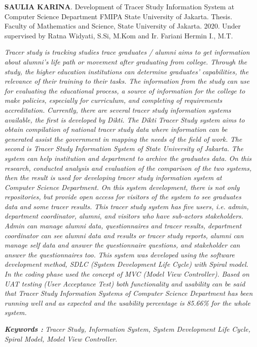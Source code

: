 \documentclass{jtetiskripsi}
\begin{document}
\begin{abstracteng}
\textbf{SAULIA KARINA}. Development of Tracer Study Information System at Computer Science Department FMIPA State University of Jakarta. Thesis. Faculty of Mathematics and Science, State University of Jakarta. 2020. Under supervised by Ratna Widyati, S.Si, M.Kom and Ir. Fariani Hermin I., M.T.
\vskip1cm
	
\textit{
Tracer study is tracking studies trace graduates / alumni aims to get information about alumni’s life path or movement after graduating from college. Through the study, the higher education institutions can determine graduates’ capabilities, the relevance of their training to their tasks. The information from the study can use for evaluating the educational process, a source of information for the college to make policies, especially for curriculum, and completing of requirements accreditation. Currently, there are several tracer study information systems available, the first is developed by Dikti. The Dikti Tracer Study system aims to obtain compilation of national tracer study data where information can be generated assist the government in mapping the needs of the field of work. The second is Tracer Study Information System of State University of Jakarta. The system can help institution and department to archive the graduates data. On this research, conducted analysis and evaluation of the comparison of the two systems, then the result is used for developing tracer study information system at Computer Science Department. On this system development, there is not only repositories, but provide open access for visitors of the system to see graduates data and some tracer results. This tracer study system has five users, i.e. admin, department coordinator, alumni, and visitors who have sub-actors stakeholders. Admin can manage alumni data, questionnaires and tracer results, department coordinator can see alumni data and results or tracer study reports, alumni can manage self data and answer the questionnaire questions, and stakeholder can answer the questionnaires too. This system was developed using the software development method, SDLC (System Development Life Cycle) with Spiral model. In the coding phase used the concept of MVC (Model View Controller). Based on UAT testing (User Acceptance Test) both functionality and usability can be said that Tracer Study Information Systems of Computer Science Department has been running well and as expected and the usability percentage is 85.66\% for the whole system. }
    
\bigskip
\noindent
\textbf{\emph{Keywords :}} \emph{Tracer Study, Information System, System Development Life Cycle, Spiral Model, Model View Controller}. 
	
\end{abstracteng}
\end{document}
